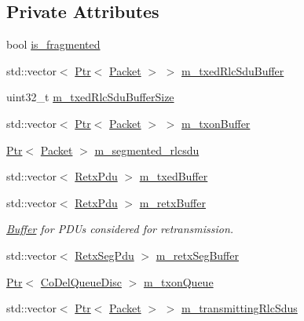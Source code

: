\subsection*{Private Attributes}
\begin{DoxyCompactItemize}
\item 
bool \hyperlink{classns3_1_1LteRlcAm_ad61d1c9547fae2b5e50ace0e38c6bee4}{is\+\_\+fragmented}
\item 
std\+::vector$<$ \hyperlink{classns3_1_1Ptr}{Ptr}$<$ \hyperlink{classns3_1_1Packet}{Packet} $>$ $>$ \hyperlink{classns3_1_1LteRlcAm_ad70b9a53e11a4ebf6e94f1fb9e86507e}{m\+\_\+txed\+Rlc\+Sdu\+Buffer}
\item 
uint32\+\_\+t \hyperlink{classns3_1_1LteRlcAm_a00aa9058dcff6947fa1c69697c564b75}{m\+\_\+txed\+Rlc\+Sdu\+Buffer\+Size}
\item 
std\+::vector$<$ \hyperlink{classns3_1_1Ptr}{Ptr}$<$ \hyperlink{classns3_1_1Packet}{Packet} $>$ $>$ \hyperlink{classns3_1_1LteRlcAm_ad8ba4549a7c78cfe0e528d2e9cc465f8}{m\+\_\+txon\+Buffer}
\item 
\hyperlink{classns3_1_1Ptr}{Ptr}$<$ \hyperlink{classns3_1_1Packet}{Packet} $>$ \hyperlink{classns3_1_1LteRlcAm_ad2ed0fae4b967ace22edbaa36fcb9935}{m\+\_\+segmented\+\_\+rlcsdu}
\item 
std\+::vector$<$ \hyperlink{structns3_1_1LteRlcAm_1_1RetxPdu}{Retx\+Pdu} $>$ \hyperlink{classns3_1_1LteRlcAm_afabb45c6de7da492347b45c139de0c28}{m\+\_\+txed\+Buffer}
\item 
std\+::vector$<$ \hyperlink{structns3_1_1LteRlcAm_1_1RetxPdu}{Retx\+Pdu} $>$ \hyperlink{classns3_1_1LteRlcAm_ab34bb5fce080a41395ad7ea5789af8d0}{m\+\_\+retx\+Buffer}
\begin{DoxyCompactList}\small\item\em \hyperlink{classns3_1_1Buffer}{Buffer} for P\+D\+Us considered for retransmission. \end{DoxyCompactList}\item 
std\+::vector$<$ \hyperlink{structns3_1_1LteRlcAm_1_1RetxSegPdu}{Retx\+Seg\+Pdu} $>$ \hyperlink{classns3_1_1LteRlcAm_aa602fa2ca8ceb4dd6261150ae8ce7073}{m\+\_\+retx\+Seg\+Buffer}
\item 
\hyperlink{classns3_1_1Ptr}{Ptr}$<$ \hyperlink{classns3_1_1CoDelQueueDisc}{Co\+Del\+Queue\+Disc} $>$ \hyperlink{classns3_1_1LteRlcAm_af5e3bc804493e8dcebe740373e5ce2a2}{m\+\_\+txon\+Queue}
\item 
std\+::vector$<$ \hyperlink{classns3_1_1Ptr}{Ptr}$<$ \hyperlink{classns3_1_1Packet}{Packet} $>$ $>$ \hyperlink{classns3_1_1LteRlcAm_a941fac42e27a28f35b0eea1a02c0595f}{m\+\_\+transmitting\+Rlc\+Sdus}

\end{DoxyCompactItemize}
